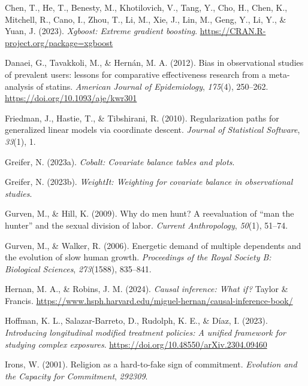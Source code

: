 \documentclass[
  single column]{article}
\newlength{\cslhangindent}
\newenvironment{CSLReferences}[2] %
 {\begin{list}{}{%
  \setlength{\itemindent}{0pt}
  \setlength{\leftmargin}{0pt}
  \setlength{\parsep}{0pt}
  \ifodd #1
   \setlength{\leftmargin}{\cslhangindent}
   \setlength{\itemindent}{-1\cslhangindent}
  \fi
  \setlength{\itemsep}{#2\baselineskip}}}
 {\end{list}}
\begin{document}
\begin{CSLReferences}{1}{0}
Chen, T., He, T., Benesty, M., Khotilovich, V., Tang, Y., Cho, H., Chen,
K., Mitchell, R., Cano, I., Zhou, T., Li, M., Xie, J., Lin, M., Geng,
Y., Li, Y., \& Yuan, J. (2023). \emph{Xgboost: Extreme gradient
boosting}. \url{https://CRAN.R-project.org/package=xgboost}

Danaei, G., Tavakkoli, M., \& Hernán, M. A. (2012). Bias in
observational studies of prevalent users: lessons for comparative
effectiveness research from a meta-analysis of statins. \emph{American
Journal of Epidemiology}, \emph{175}(4), 250--262.
\url{https://doi.org/10.1093/aje/kwr301}

Friedman, J., Hastie, T., \& Tibshirani, R. (2010). Regularization paths
for generalized linear models via coordinate descent. \emph{Journal of
Statistical Software}, \emph{33}(1), 1.

Greifer, N. (2023a). \emph{Cobalt: Covariate balance tables and plots}.

Greifer, N. (2023b). \emph{WeightIt: Weighting for covariate balance in
observational studies}.

Gurven, M., \& Hill, K. (2009). Why do men hunt? A reevaluation of
{``man the hunter''} and the sexual division of labor. \emph{Current
Anthropology}, \emph{50}(1), 51--74.

Gurven, M., \& Walker, R. (2006). Energetic demand of multiple
dependents and the evolution of slow human growth. \emph{Proceedings of
the Royal Society B: Biological Sciences}, \emph{273}(1588), 835--841.

Hernan, M. A., \& Robins, J. M. (2024). \emph{Causal inference: What
if?} Taylor \& Francis.
\url{https://www.hsph.harvard.edu/miguel-hernan/causal-inference-book/}

Hoffman, K. L., Salazar-Barreto, D., Rudolph, K. E., \& Díaz, I. (2023).
\emph{Introducing longitudinal modified treatment policies: A unified
framework for studying complex exposures}.
\url{https://doi.org/10.48550/arXiv.2304.09460}

Irons, W. (2001). Religion as a hard-to-fake sign of commitment.
\emph{Evolution and the Capacity for Commitment}, \emph{292309}.


\end{CSLReferences}
\end{document}
